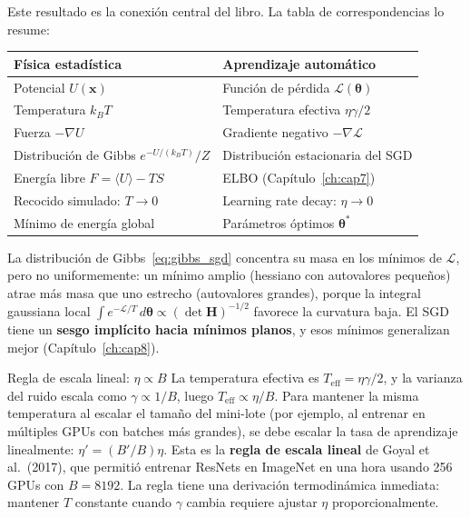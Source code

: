 Este resultado es la conexión central del libro. La tabla de
correspondencias lo resume:

\begin{center}
\begin{tabular}{ll}
\toprule
\textbf{Física estadística} & \textbf{Aprendizaje automático} \\
\midrule
Potencial $U(\bm{x})$ & Función de pérdida $\mathcal{L}(\bm{\theta})$ \\
Temperatura $k_BT$ & Temperatura efectiva $\eta\gamma/2$ \\
Fuerza $-\nabla U$ & Gradiente negativo $-\nabla\mathcal{L}$ \\
Distribución de Gibbs $e^{-U/(k_BT)}/Z$ & Distribución estacionaria del SGD \\
Energía libre $F = \langle U\rangle - TS$ & ELBO (Capítulo~\ref{ch:cap7}) \\
Recocido simulado: $T \to 0$ & Learning rate decay: $\eta \to 0$ \\
Mínimo de energía global & Parámetros óptimos $\bm{\theta}^*$ \\
\bottomrule
\end{tabular}
\end{center}

La distribución de Gibbs~\eqref{eq:gibbs_sgd} concentra su masa en los
mínimos de $\mathcal{L}$, pero no uniformemente: un mínimo amplio (hessiano
con autovalores pequeños) atrae más masa que uno estrecho (autovalores
grandes), porque la integral gaussiana local
$\int e^{-\mathcal{L}/T}\,d\bm{\theta} \propto
(\det\bm{H})^{-1/2}$ favorece la curvatura baja. El SGD tiene un
\textbf{sesgo implícito hacia mínimos planos}, y esos mínimos generalizan
mejor (Capítulo~\ref{ch:cap8}).

\begin{fisicaconexion}{Regla de escala lineal: $\eta \propto B$}
\label{fc:escala_lineal}
La temperatura efectiva es $T_{\text{eff}} = \eta\gamma/2$, y la varianza
del ruido escala como $\gamma \propto 1/B$, luego
$T_{\text{eff}} \propto \eta/B$. Para mantener la misma temperatura al
escalar el tamaño del mini-lote (por ejemplo, al entrenar en múltiples
GPUs con batches más grandes), se debe escalar la tasa de aprendizaje
linealmente: $\eta' = (B'/B)\eta$. Esta es la \textbf{regla de escala
lineal} de Goyal et al.\ (2017), que permitió entrenar ResNets en ImageNet
en una hora usando 256 GPUs con $B = 8192$. La regla tiene una derivación
termodinámica inmediata: mantener $T$ constante cuando $\gamma$ cambia
requiere ajustar $\eta$ proporcionalmente.
\end{fisicaconexion}

